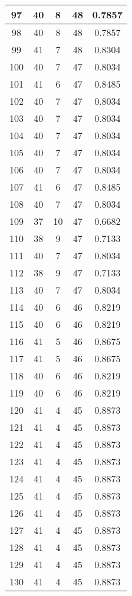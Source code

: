 \documentclass[letterpaper, 12pt]{article}
\begin{document}
\begin{longtable}{|c|c|c|c|c|}
\hline
97 & 40 & 8 & 48 & 0.7857 \\
\hline
98 & 40 & 8 & 48 & 0.7857 \\
\hline
99 & 41 & 7 & 48 & 0.8304 \\
\hline
100 & 40 & 7 & 47 & 0.8034 \\
\hline
101 & 41 & 6 & 47 & 0.8485 \\
\hline
102 & 40 & 7 & 47 & 0.8034 \\
\hline
103 & 40 & 7 & 47 & 0.8034 \\
\hline
104 & 40 & 7 & 47 & 0.8034 \\
\hline
105 & 40 & 7 & 47 & 0.8034 \\
\hline
106 & 40 & 7 & 47 & 0.8034 \\
\hline
107 & 41 & 6 & 47 & 0.8485 \\
\hline
108 & 40 & 7 & 47 & 0.8034 \\
\hline
109 & 37 & 10 & 47 & 0.6682 \\
\hline
110 & 38 & 9 & 47 & 0.7133 \\
\hline
111 & 40 & 7 & 47 & 0.8034 \\
\hline
112 & 38 & 9 & 47 & 0.7133 \\
\hline
113 & 40 & 7 & 47 & 0.8034 \\
\hline
114 & 40 & 6 & 46 & 0.8219 \\
\hline
115 & 40 & 6 & 46 & 0.8219 \\
\hline
116 & 41 & 5 & 46 & 0.8675 \\
\hline
117 & 41 & 5 & 46 & 0.8675 \\
\hline
118 & 40 & 6 & 46 & 0.8219 \\
\hline
119 & 40 & 6 & 46 & 0.8219 \\
\hline
120 & 41 & 4 & 45 & 0.8873 \\
\hline
121 & 41 & 4 & 45 & 0.8873 \\
\hline
122 & 41 & 4 & 45 & 0.8873 \\
\hline
123 & 41 & 4 & 45 & 0.8873 \\
\hline
124 & 41 & 4 & 45 & 0.8873 \\
\hline
125 & 41 & 4 & 45 & 0.8873 \\
\hline
126 & 41 & 4 & 45 & 0.8873 \\
\hline
127 & 41 & 4 & 45 & 0.8873 \\
\hline
128 & 41 & 4 & 45 & 0.8873 \\
\hline
129 & 41 & 4 & 45 & 0.8873 \\
\hline
130 & 41 & 4 & 45 & 0.8873 \\

\end{longtable}
\end{document}
